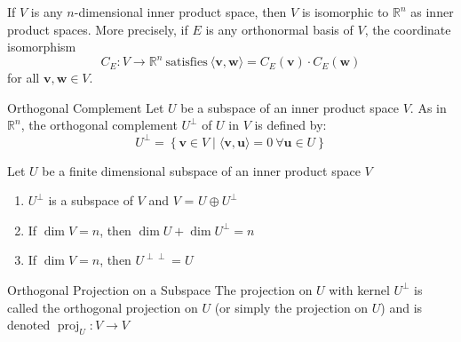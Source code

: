 \documentclass[12pt]{article}
\begin{document}
\begin{corollary}{}{}
    If $ V $ is any $ n $-dimensional inner product space, then $ V $ is isomorphic to $ \mathbb{R}^n $ as inner product spaces. More precisely, if $ E $ is any orthonormal basis of $ V $, the coordinate isomorphism
    \[ C_E : V \to \mathbb{R}^n \ \text{satisfies} \ \langle \mathbf{v}, \mathbf{w} \rangle = C_E \left( \mathbf{v} \right) \cdot C_E \left( \mathbf{w} \right) \]
    for all $ \mathbf{v}, \mathbf{w} \in V $.
\end{corollary}

\begin{definition}{Orthogonal Complement}{}
    Let $ U $ be a subspace of an inner product space $ V $. As in $ \mathbb{R}^n $, the orthogonal complement $ U^\perp $ of $ U $ in $ V $ is defined by:
    \[ U^\perp = \left\{ \mathbf{v} \in V \mid \langle \mathbf{v}, \mathbf{u} \rangle = 0 \ \forall \mathbf{u} \in U \right\} \]
\end{definition}

\begin{theorem}{}{}
    Let $ U $ be a finite dimensional subspace of an inner product space $ V $
    \begin{enumerate}[label=(\roman*)]
        \item $ U^\perp $ is a subspace of $ V $ and $ V $ = $ U \oplus U^\perp $
        \item If $ \dim V = n $, then $ \dim U + \dim U^\perp = n $
        \item If $ \dim V = n $, then $ U^{\perp \perp} = U $
    \end{enumerate}
\end{theorem}

\begin{definition}{Orthogonal Projection on a Subspace}{}
    The projection on $ U $ with kernel $ U^\perp $ is called the orthogonal projection on $ U $ (or simply the projection on $ U $) and is denoted $ \operatorname{proj}_U : V \to V $
\end{definition}
\end{document}
